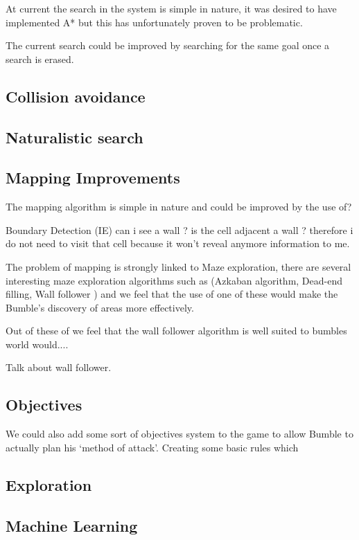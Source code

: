 \documentclass[a4paper,oneside]{report}
\begin{document}
At current the search in the system is simple in nature, it was desired to have implemented A* but this has unfortunately proven to be problematic.
		
The current search could be improved by searching for the same goal once a search is erased.
				
\subsection{Collision avoidance}
		
\subsection{Naturalistic search} 
		
\subsection{Mapping Improvements}

The mapping algorithm is simple in nature and could be improved by the use of? 
		
Boundary Detection (IE) can i see a wall ? is the cell adjacent a wall ? therefore i do not need to visit that cell because it won't reveal anymore information to me. 
	
The problem of mapping is strongly linked to Maze exploration, there are several interesting maze exploration algorithms such as (Azkaban algorithm, Dead-end filling, Wall follower ) and we feel that the use of one of these would make the Bumble's discovery of areas more effectively. 
	
		Out of these of  we feel that the wall follower algorithm is well suited to bumbles world would.... 
		
		Talk about wall follower.
		
\subsection{Objectives}

We could also add some sort of objectives system to the game to allow Bumble to actually plan his `method of attack'. Creating some basic rules which 

\subsection{Exploration}

\subsection{Machine Learning}
\end{document}
